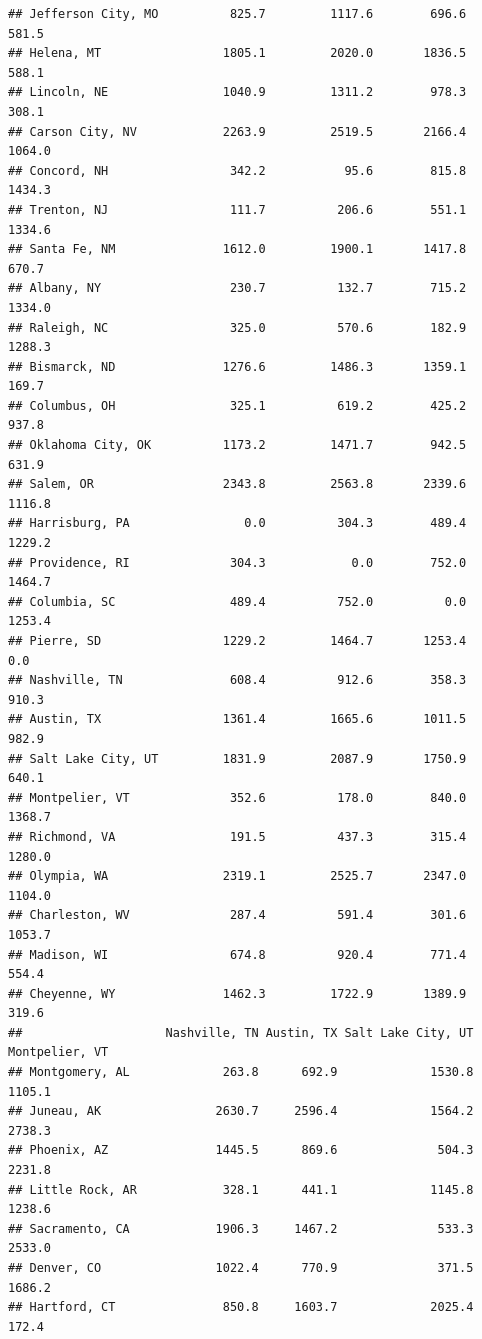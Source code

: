 \documentclass[
]{article}
\begin{document}
\begin{verbatim}
## Jefferson City, MO          825.7         1117.6        696.6      581.5
## Helena, MT                 1805.1         2020.0       1836.5      588.1
## Lincoln, NE                1040.9         1311.2        978.3      308.1
## Carson City, NV            2263.9         2519.5       2166.4     1064.0
## Concord, NH                 342.2           95.6        815.8     1434.3
## Trenton, NJ                 111.7          206.6        551.1     1334.6
## Santa Fe, NM               1612.0         1900.1       1417.8      670.7
## Albany, NY                  230.7          132.7        715.2     1334.0
## Raleigh, NC                 325.0          570.6        182.9     1288.3
## Bismarck, ND               1276.6         1486.3       1359.1      169.7
## Columbus, OH                325.1          619.2        425.2      937.8
## Oklahoma City, OK          1173.2         1471.7        942.5      631.9
## Salem, OR                  2343.8         2563.8       2339.6     1116.8
## Harrisburg, PA                0.0          304.3        489.4     1229.2
## Providence, RI              304.3            0.0        752.0     1464.7
## Columbia, SC                489.4          752.0          0.0     1253.4
## Pierre, SD                 1229.2         1464.7       1253.4        0.0
## Nashville, TN               608.4          912.6        358.3      910.3
## Austin, TX                 1361.4         1665.6       1011.5      982.9
## Salt Lake City, UT         1831.9         2087.9       1750.9      640.1
## Montpelier, VT              352.6          178.0        840.0     1368.7
## Richmond, VA                191.5          437.3        315.4     1280.0
## Olympia, WA                2319.1         2525.7       2347.0     1104.0
## Charleston, WV              287.4          591.4        301.6     1053.7
## Madison, WI                 674.8          920.4        771.4      554.4
## Cheyenne, WY               1462.3         1722.9       1389.9      319.6
##                    Nashville, TN Austin, TX Salt Lake City, UT Montpelier, VT
## Montgomery, AL             263.8      692.9             1530.8         1105.1
## Juneau, AK                2630.7     2596.4             1564.2         2738.3
## Phoenix, AZ               1445.5      869.6              504.3         2231.8
## Little Rock, AR            328.1      441.1             1145.8         1238.6
## Sacramento, CA            1906.3     1467.2              533.3         2533.0
## Denver, CO                1022.4      770.9              371.5         1686.2
## Hartford, CT               850.8     1603.7             2025.4          172.4

\end{verbatim}
\end{document}
